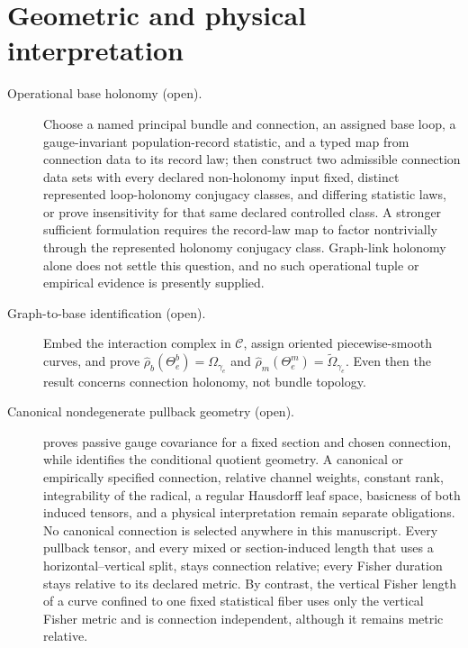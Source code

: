 \section{Geometric and physical interpretation}

\begin{description}
\item[Operational base holonomy (open).]
Choose a named principal bundle and connection, an assigned base loop, a
gauge-invariant population-record statistic, and a typed map from connection
data to its record law; then construct two admissible connection data sets
with every declared non-holonomy input fixed, distinct represented loop-holonomy
conjugacy classes, and differing statistic laws, or prove insensitivity for
that same declared controlled class.  A stronger sufficient formulation
requires the record-law map to factor nontrivially through the represented
holonomy conjugacy class.
Graph-link holonomy alone does not settle this question, and no such
operational tuple or empirical evidence is presently supplied. 

\item[Graph-to-base identification (open).]
Embed the interaction complex in \(\mathcal C\), assign oriented
piecewise-smooth curves, and prove
\(\widehat\rho_b(\Theta_e^b)=\Omega_{\gamma_e}\) and
\(\widehat\rho_m(\Theta_e^m)=\widetilde\Omega_{\gamma_e}\).
Even then the result concerns connection holonomy, not bundle topology.

\item[Canonical nondegenerate pullback geometry (open).]
 proves passive gauge covariance for a
fixed section and chosen connection, while
 identifies the conditional quotient
geometry.  A canonical or empirically specified connection, relative channel
weights, constant rank, integrability of the radical, a regular Hausdorff leaf
space, basicness of both induced tensors, and a physical interpretation remain
separate obligations.  No canonical connection is selected anywhere in this
manuscript.  Every pullback tensor, and every mixed or section-induced length
that uses a horizontal--vertical split, stays connection relative; every
Fisher duration stays relative to its declared metric.  By contrast, the
vertical Fisher length of a curve confined to one fixed statistical fiber uses
only the vertical Fisher metric and is connection independent, although it
remains metric relative. 


\end{description}
